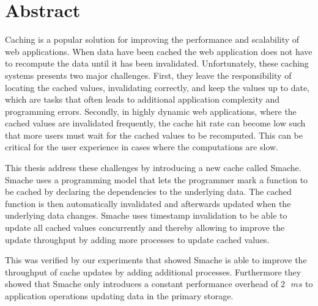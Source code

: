 \chapter{Abstract}

Caching is a popular solution for improving the performance and scalability of web applications. When data have been cached the web application does not have to recompute the data until it has been invalidated. Unfortunately, these caching systems presents two major challenges. First, they leave the responsibility of locating the cached values, invalidating correctly, and keep the values up to date, which are tasks that often leads to additional application complexity and programming errors. Secondly, in highly dynamic web applications, where the cached values are invalidated frequently, the cache hit rate can become low such that more users must wait for the cached values to be recomputed. This can be critical for the user experience in cases where the computations are slow.

This thesis address these challenges by introducing a new cache called Smache. Smache uses a programming model that lets the programmer mark a function to be cached by declaring the dependencies to the underlying data. The cached function is then automatically invalidated and afterwards updated when the underlying data changes. Smache uses timestamp invalidation to be able to update all cached values concurrently and thereby allowing to improve the update throughput by adding more processes to update cached values.

This was verified by our experiments that showed Smache is able to improve the throughput of cache updates by adding additional processes. Furthermore they showed that Smache only introduces a constant performance overhead of $2\text{ }ms$ to application operations updating data in the primary storage.

